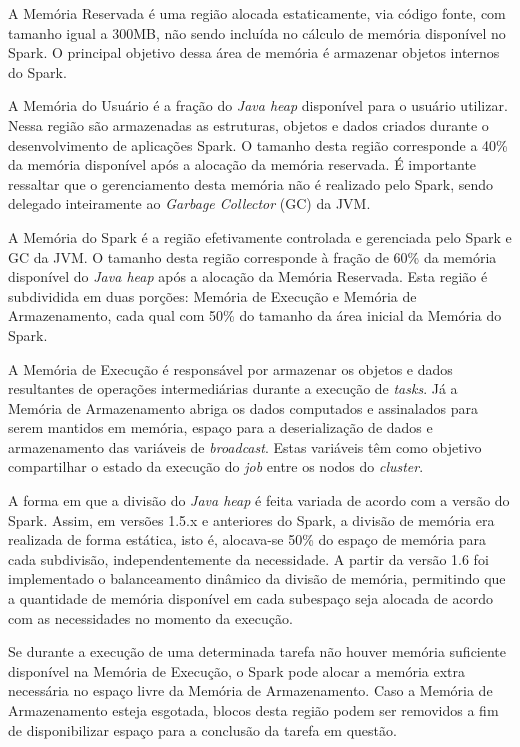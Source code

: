 A Memória Reservada é uma região alocada estaticamente, via código fonte, com tamanho igual a 300MB, não sendo incluída no cálculo de memória disponível no Spark. O principal objetivo dessa área de memória é armazenar objetos internos do Spark.

A Memória do Usuário é a fração do \textit{Java heap} disponível para o usuário utilizar. Nessa região são armazenadas as estruturas, objetos e dados criados durante o desenvolvimento de aplicações Spark. O tamanho desta região corresponde a 40\% da memória disponível após a alocação da memória reservada. É importante ressaltar que o gerenciamento desta memória não é realizado pelo Spark, sendo delegado inteiramente ao \textit{Garbage Collector} (GC) da JVM.

A Memória do Spark é a região efetivamente controlada e gerenciada pelo Spark e GC da JVM. O tamanho desta região corresponde à fração de 60\% da memória disponível do \textit{Java heap} após a alocação da Memória Reservada. Esta região é subdividida em duas porções: Memória de Execução e Memória de Armazenamento, cada qual com 50\% do tamanho da área inicial da Memória do Spark. 

A Memória de Execução é responsável por armazenar os objetos e dados resultantes de operações intermediárias durante a execução de \textit{tasks}. Já a Memória de Armazenamento abriga os dados computados e assinalados para serem mantidos em memória, espaço para a deserialização de dados e armazenamento das variáveis de \textit{broadcast}. Estas variáveis têm como objetivo compartilhar o estado da execução do \textit{job} entre os nodos do \textit{cluster}.

A forma em que a divisão do \textit{Java heap} é feita variada de acordo com a versão do Spark. Assim, em versões 1.5.x e anteriores do Spark, a divisão de memória era realizada de forma estática, isto é, alocava-se 50\% do espaço de memória para cada subdivisão, independentemente da necessidade. A partir da versão 1.6 foi implementado o balanceamento dinâmico da divisão de memória, permitindo que a quantidade de memória disponível em cada subespaço seja alocada de acordo com as necessidades no momento da execução. 

Se durante a execução de uma determinada tarefa não houver memória suficiente disponível na Memória de Execução, o Spark pode alocar a memória extra necessária no espaço livre da Memória de Armazenamento. Caso a Memória de Armazenamento esteja esgotada, blocos desta região podem ser removidos a fim de disponibilizar espaço para a conclusão da tarefa em questão. 

